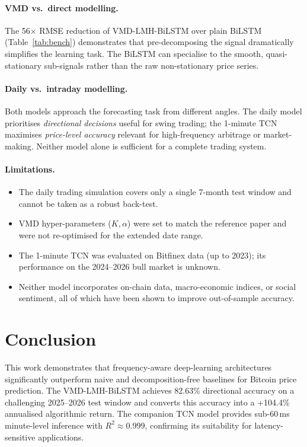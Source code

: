 \documentclass[12pt,a4paper]{article}
\begin{document}
\paragraph{VMD vs.\ direct modelling.}
The 56$\times$ RMSE reduction of VMD-LMH-BiLSTM over plain BiLSTM (Table~\ref{tab:bench})
demonstrates that pre-decomposing the signal dramatically simplifies the
learning task.  The BiLSTM can specialise to the smooth, quasi-stationary
sub-signals rather than the raw non-stationary price series.

\paragraph{Daily vs.\ intraday modelling.}
Both models approach the forecasting task from different angles.
The daily model prioritises \emph{directional decisions} useful for swing
trading; the 1-minute TCN maximises \emph{price-level accuracy} relevant
for high-frequency arbitrage or market-making.  Neither model alone is
sufficient for a complete trading system.

\paragraph{Limitations.}
\begin{itemize}[leftmargin=*]
  \item The daily trading simulation covers only a single 7-month test window
        and cannot be taken as a robust back-test.
  \item VMD hyper-parameters ($K, \alpha$) were set to match the reference
        paper and were not re-optimised for the extended date range.
  \item The 1-minute TCN was evaluated on Bitfinex data (up to 2023); its
        performance on the 2024--2026 bull market is unknown.
  \item Neither model incorporates on-chain data, macro-economic indices, or
        social sentiment, all of which have been shown to improve out-of-sample
        accuracy.
\end{itemize}

\section{Conclusion}
\label{sec:conclusion}

This work demonstrates that frequency-aware deep-learning architectures
significantly outperform naive and decomposition-free baselines for Bitcoin
price prediction.  The VMD-LMH-BiLSTM achieves 82.63\% directional accuracy
on a challenging 2025--2026 test window and converts this accuracy into a
+104.4\% annualised algorithmic return.  The companion TCN model provides
sub-60\,ms minute-level inference with $R^2 \approx 0.999$, confirming its
suitability for latency-sensitive applications.
\end{document}
